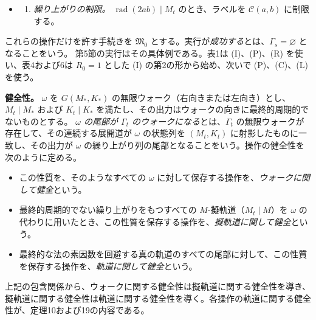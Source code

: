 \documentclass[11pt,reqno]{amsart}
\theoremstyle{definition}
\theoremstyle{definition}
\theoremstyle{remark}
\providecommand{\tightlist}{\setlength{\itemsep}{0pt}\setlength{\parskip}{0pt}}
\begin{document}
\begin{itemize}
\begin{enumerate}
    \emph{法の拡大。} \(M_{t+1}=hM_t\) とする。各辺を、その展開道に沿った \(M_{t+1}\) を法とする剰余列のすべてで置き換える。ただし、各剰余が単元であり、各ステップで (E2) を満たすことを課す（\(b\) の逆元の存在は仮定せず、すべての解を取る）。素数 \(p\nmid ab\) による持ち上げ（第4.4節）は \(h=p\) の場合であり、(I) の第2の形では、新たな素数は \(2ab\) を割らない。
  \end{enumerate}
\item
  \begin{enumerate}
  \def\labelenumi{(\Alph{enumi})}
  \tightlist
  \item
    \emph{繰り上がりの制限。} \(\operatorname{rad}(2ab)\mid M_t\) のとき、ラベルを \(\mathcal C(a,b)\) に制限する。
  \end{enumerate}
\end{itemize}

これらの操作だけを許す手続きを \(\mathfrak M_0\) とする。実行が\emph{成功する}とは、\(\Gamma_s=\varnothing\) となることをいう。
第5節の実行はその具体例である。表1は (I)、(P)、(R) を使い、表4および6は \(R_0=1\) とした (I) の第2の形から始め、次いで (P)、(C)、(L) を使う。

\textbf{健全性。} \(\omega\) を \(G(M_*,K_*)\) の無限ウォーク（右向きまたは左向き）とし、\(M_t\mid M_*\) および \(K_t\mid K_*\) を満たし、その出力はウォークの向きに最終的周期的でないものとする。
\emph{\(\omega\) の尾部が \(\Gamma_t\) のウォークになる}とは、\(\Gamma_t\) の無限ウォークが存在して、その連続する展開道が \(\omega\) の状態列を \((M_t,K_t)\) に射影したものに一致し、その出力が \(\omega\) の繰り上がり列の尾部となることをいう。操作の健全性を次のように定める。

\begin{itemize}
\tightlist
\item
  この性質を、そのようなすべての \(\omega\) に対して保存する操作を、\emph{ウォークに関して健全}という。
\item
  最終的周期的でない繰り上がりをもつすべての \(M\)-擬軌道（\(M_t\mid M\)）を \(\omega\) の代わりに用いたとき、この性質を保存する操作を、\emph{擬軌道に関して健全}という。
\item
  最終的な法の素因数を回避する真の軌道のすべての尾部に対して、この性質を保存する操作を、\emph{軌道に関して健全}という。
\end{itemize}

上記の包含関係から、ウォークに関する健全性は擬軌道に関する健全性を導き、擬軌道に関する健全性は軌道に関する健全性を導く。各操作の軌道に関する健全性が、定理10および19の内容である。
\end{document}
